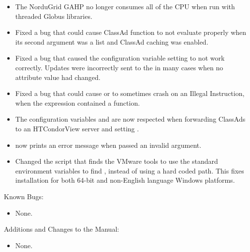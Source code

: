 \begin{itemize}
\item The NorduGrid GAHP no longer consumes all of the CPU when run
with threaded Globus libraries.

\item Fixed a bug that could cause ClassAd function  to not
evaluate properly when its second argument was a list and ClassAd caching
was enabled.

\item Fixed a bug that caused the configuration variable setting 
 to not work correctly.  
Updates were incorrectly sent to the 
in many cases when no attribute value had changed.

\item Fixed a bug that could cause   or 
to sometimes crash on an Illegal Instruction, 
when the  expression contained a function.

\item The configuration variables 
and  are now respected when forwarding
ClassAds to an HTCondorView server and setting .

\item {} now prints an error message when passed an invalid argument.

\item Changed the script that finds the VMware tools to use the standard
environment variables to find , instead of using a
hard coded path.
This fixes installation for both 64-bit and non-English language Windows 
platforms.

\end{itemize}

\noindent Known Bugs:

\begin{itemize}

\item None.

\end{itemize}

\noindent Additions and Changes to the Manual:

\begin{itemize}

\item None.

\end{itemize}


